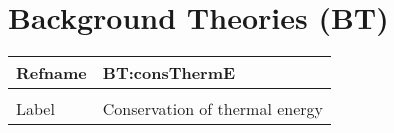 \documentclass[12pt]{article}
\begin{document}
\section{Background Theories (BT)} \label{Sec:BTs}


\noindent
\begin{minipage}{\textwidth}
\begin{tabular}{>{\raggedright}p{}>{\raggedright\arraybackslash}p{}}
\toprule \textbf{Refname} & \textbf{BT:consThermE}
\label{BT:consThermE}
\\ \midrule \\
Label & Conservation of thermal energy
        

\end{tabular}
\end{minipage}
\end{document}
